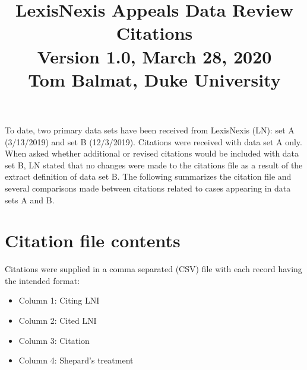 \documentclass[10pt, letterpaper]{article}
\title{\large LexisNexis Appeals Data Review\\[4pt]Citations\\[4pt]
       \normalsize Version 1.0, March 28, 2020\\[4pt]Tom Balmat, Duke University\\[-20pt]}
\date{}
\begin{document}
    
\begin{spacing}{1.0}

\maketitle

To date, two primary data sets have been received from LexisNexis (LN):  set A (3/13/2019) and set B (12/3/2019).  Citations were received with data set A only.  When asked whether additional or revised citations would be included with data set B, LN stated that no changes were made to the citations file as a result of the extract definition of data set B.  The following summarizes the citation file and several comparisons made between citations related to cases appearing in data sets A and B.

\vspace{0.25in}

\renewcommand\cfttoctitlefont{\large}
\renewcommand\cftsecfont{\normalsize}
\renewcommand\cftsecpagefont{\normalsize}
\renewcommand\cftsubsecfont{\normalsize}
\renewcommand\cftsubsecpagefont{\normalsize}
\renewcommand{\cftsecleader}{\cftdotfill{\cftdotsep}}
\renewcommand*\contentsname{List of Sections}
\begin{center}
    \begin{minipage}{5.5in}
        \tableofcontents
    \end{minipage}
\end{center}


\clearpage

\section{Citation file contents}

Citations were supplied in a comma separated (CSV) file with each record having the intended format:

\begin{itemize}\setlength\itemsep{1pt}
    \item Column 1:  Citing LNI
    \item Column 2:  Cited LNI
    \item Column 3:  Citation
    \item Column 4: Shepard’s treatment
\end{itemize}


\end{spacing}
\end{document}
